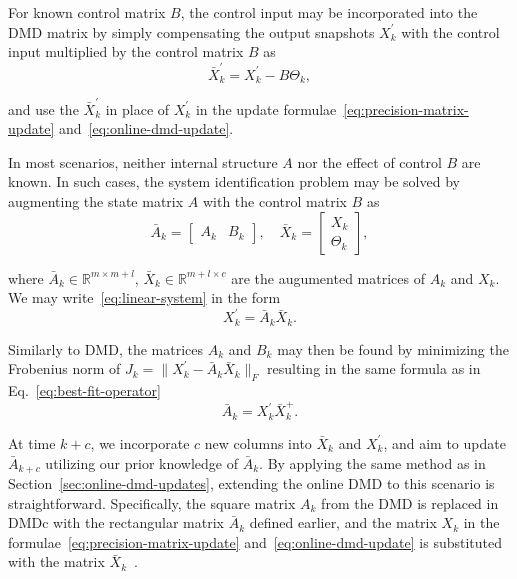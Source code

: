 For known control matrix \(B\), the control input may be incorporated into the DMD matrix by simply compensating the output snapshots \(X^\prime_k\) with the control input multiplied by the control matrix \(B\) as
\begin{equation}\label{eq:control-compensation}
    \bar{X}^\prime_k = X^\prime_k - B \Theta_k,
\end{equation}

and use the \(\bar{X}^\prime_k\) in place of \(X^\prime_k\) in the update formulae~\eqref{eq:precision-matrix-update} and~\eqref{eq:online-dmd-update}.

In most scenarios, neither internal structure \(A\) nor the effect of control \(B\) are known. In such cases, the system identification problem may be solved by augmenting the state matrix \(A\) with the control matrix \(B\) as
\begin{equation}\label{eq:augmented-matrix}
    \bar{A}_k = \begin{bmatrix} A_k & B_k \end{bmatrix}, \quad \bar{X}_k = \begin{bmatrix} X_k \\ \Theta_k \end{bmatrix} ,
\end{equation}

where \(\bar{A}_k \in \mathbb{R}^{m \times m + l}\), \(\bar{X}_k \in \mathbb{R}^{m + l \times c}\) are the augumented matrices of \(A_k\) and \(X_k\). We may write~\eqref{eq:linear-system} in the form
\begin{equation*}
    X^\prime_k = \bar{A}_k \bar{X}_k.
\end{equation*}

Similarly to DMD, the matrices \(A_k\) and \(B_k\) may then be found by minimizing the Frobenius norm of \(J_k = \|X^\prime_k - \bar{A}_k \bar{X}_k\|_F\) resulting in the same  formula as in Eq.~\eqref{eq:best-fit-operator}
\begin{equation*}
    \bar{A}_k = X^\prime_k \bar{X}_k^+.
\end{equation*}

At time \(k+c\), we incorporate \(c\) new columns into \(\bar{X}_k\) and \(X^\prime_k\), and aim to update \(\bar{A}_{k+c}\) utilizing our prior knowledge of \(\bar{A}_k\). By applying the same method as in Section~\ref{sec:online-dmd-updates}, extending the online DMD to this scenario is straightforward. Specifically, the square matrix \(A_k\) from the DMD is replaced in DMDc with the rectangular matrix \(\bar{A}_k\) defined earlier, and the matrix \(X_k\) in the formulae~\eqref{eq:precision-matrix-update} and~\eqref{eq:online-dmd-update} is substituted with the matrix \(\bar{X}_k\)~\citep{Zhang2019}.

